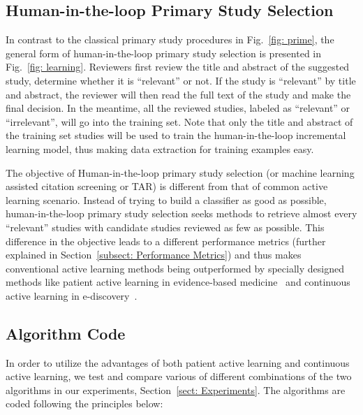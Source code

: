 \documentclass{svjour3}
\theoremstyle{break}
\begin{document}
\subsection{Human-in-the-loop Primary Study Selection}
\label{subsect: Learning based Primary Study Selection}


In contrast to the classical primary study procedures in Fig.~\ref{fig: prime}, the general form of human-in-the-loop primary study selection is presented in
Fig.~\ref{fig: learning}. Reviewers first review the title and abstract of the
suggested study, determine whether it is ``relevant'' or not. If the study is
``relevant'' by title and abstract, the reviewer will then read the full text of
the study and make the final decision. In the meantime, all the reviewed
studies, labeled as ``relevant'' or ``irrelevant'', will go into the training
set. Note that only the title and abstract of the training set studies will be used to
train the human-in-the-loop incremental learning model, thus making data extraction for training examples easy.

The objective of Human-in-the-loop primary study selection (or machine learning
assisted citation screening or TAR) is different from that of common active
learning scenario. Instead of trying to build a classifier as good as possible,
human-in-the-loop primary study selection seeks methods to retrieve almost every
``relevant'' studies with candidate studies reviewed as few as possible. This
difference in the objective leads to a different performance metrics (further explained in Section~\ref{subsect: Performance Metrics}) and thus
makes conventional active learning methods being outperformed by specially
designed methods like patient active learning in evidence-based
medicine~\cite{wallace2010semi} and continuous active learning in
e-discovery~\cite{cormack2014evaluation,cormack2015autonomy}.



\subsection{Algorithm Code}
\label{sect: Algorithm Code}

In order to utilize the advantages of both patient active learning and continuous active learning, we test and compare various of different combinations of the two algorithms in our experiments, Section~\ref{sect: Experiments}. The algorithms are coded following the principles below:
\end{document}
